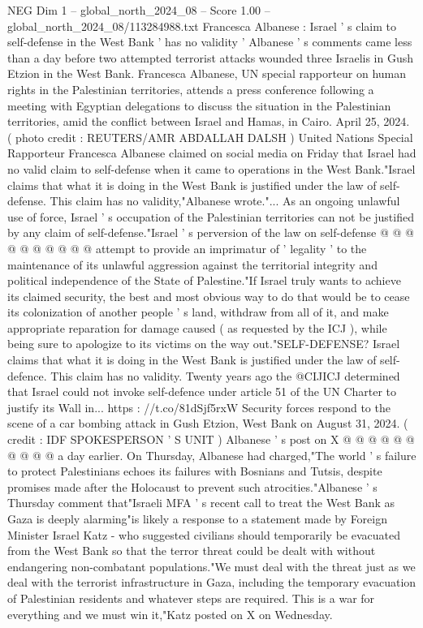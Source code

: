 \begin{textsample}{NEG Dim 1 – global\_north\_2024\_08 – Score 1.00 – global\_north\_2024\_08/113284988.txt}  \label{ex:f1_neg_379}
Francesca Albanese : Israel ' s claim to self-defense in the West Bank ' has no validity ' Albanese ' s comments came less than a day before two attempted terrorist attacks wounded three Israelis in Gush Etzion in the West Bank.
Francesca Albanese, UN special rapporteur on human rights in the Palestinian territories, attends a press conference following a meeting with Egyptian delegations to discuss the situation in the Palestinian territories, amid the conflict between Israel and Hamas, in Cairo.
April 25, 2024. ( photo credit : REUTERS/AMR ABDALLAH DALSH ) United Nations Special Rapporteur Francesca Albanese claimed on social media on Friday that Israel had no valid claim to self-defense when it came to operations in the West Bank."Israel claims that what it is doing in the West Bank is justified under the law of self-defense.
This claim has no validity,"Albanese wrote."...
As an ongoing unlawful use of force, Israel ' s occupation of the Palestinian territories can not be justified by any claim of self-defense."Israel ' s perversion of the law on self-defense @ @ @ @ @ @ @ @ @ @ attempt to provide an imprimatur of ' legality ' to the maintenance of its unlawful aggression against the territorial integrity and political independence of the State of Palestine."If Israel truly wants to achieve its claimed security, the best and most obvious way to do that would be to cease its colonization of another people ' s land, withdraw from all of it, and make appropriate reparation for damage caused ( as requested by the ICJ ), while being sure to apologize to its victims on the way out."SELF-DEFENSE?
Israel claims that what it is doing in the West Bank is justified under the law of self-defence.
This claim has no validity.
Twenty years ago the @CIJICJ determined that Israel could not invoke self-defence under article 51 of the UN Charter to justify its Wall in... https : //t.co/81dSjf5rxW Security forces respond to the scene of a car bombing attack in Gush Etzion, West Bank on August 31, 2024. ( credit : IDF SPOKESPERSON ' S UNIT ) Albanese ' s post on X @ @ @ @ @ @ @ @ @ @ a day earlier.
On Thursday, Albanese had charged,"The world ' s failure to protect Palestinians echoes its failures with Bosnians and Tutsis, despite promises made after the Holocaust to prevent such atrocities."Albanese ' s Thursday comment that"Israeli MFA ' s recent call to treat the West Bank as Gaza is deeply alarming"is likely a response to a statement made by Foreign Minister Israel Katz - who suggested civilians should temporarily be evacuated from the West Bank so that the terror threat could be dealt with without endangering non-combatant populations."We must deal with the threat just as we deal with the terrorist infrastructure in Gaza, including the temporary evacuation of Palestinian residents and whatever steps are required.
This is a war for everything and we must win it,"Katz posted on X on Wednesday.

\end{textsample}
